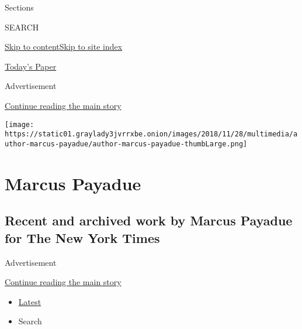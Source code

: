 Sections

SEARCH

\protect\hyperlink{site-content}{Skip to
content}\protect\hyperlink{site-index}{Skip to site index}

\href{https://myaccount.nytimes3xbfgragh.onion/auth/login?response_type=cookie\&client_id=vi}{}

\href{https://www.nytimes3xbfgragh.onion/section/todayspaper}{Today's
Paper}

Advertisement

\protect\hyperlink{after-top}{Continue reading the main story}

\texttt{[image: https://static01.graylady3jvrrxbe.onion/images/2018/11/28/multimedia/author-marcus-payadue/author-marcus-payadue-thumbLarge.png]}

\hypertarget{marcus-payadue}{%
\section{Marcus Payadue}\label{marcus-payadue}}

\hypertarget{recent-and-archived-work-by-marcus-payadue-for-the-new-york-times}{%
\subsection{Recent and archived work by Marcus Payadue for The New York
Times}\label{recent-and-archived-work-by-marcus-payadue-for-the-new-york-times}}

Advertisement

\protect\hyperlink{after-mid1}{Continue reading the main story}

\begin{itemize}
\tightlist
\item
  \protect\hyperlink{stream-panel}{Latest}
\item
  Search
\end{itemize}

